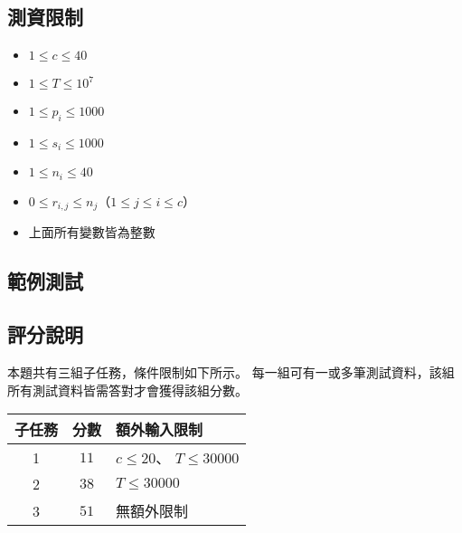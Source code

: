\subsection{測資限制}

\begin{itemize}
\tightlist
\item
  \begin{math}1 \leq c \leq 40\end{math}
\item
  \begin{math}1 \leq T \leq 10^7\end{math}
\item
  \begin{math}1 \leq p_i \leq 1000\end{math}
\item
  \begin{math}1 \leq s_i \leq 1000\end{math}
\item
  \begin{math}1 \leq n_i \leq 40\end{math}
\item
  \begin{math}0 \leq r_{i, j} \leq n_j\end{math}（\begin{math}1 \le j \le i \le c\end{math}）
\item
  上面所有變數皆為整數
\end{itemize}

\subsection{範例測試}

\begin{example}
%
%
%
%
\end{example}

\newpage

\subsection{評分說明}

本題共有三組子任務，條件限制如下所示。
每一組可有一或多筆測試資料，該組所有測試資料皆需答對才會獲得該組分數。

\begin{longtable}[]{@{}ccl@{}}
\toprule
子任務 & 分數 & 額外輸入限制 \\
\midrule
\endhead
1 & \(11\) & \begin{math}c \le 20\end{math}、
\begin{math}T \le 30000\end{math} \\
2 & \(38\) & \begin{math}T \le 30000\end{math} \\
3 & \(51\) & 無額外限制 \\
\bottomrule
\end{longtable}

